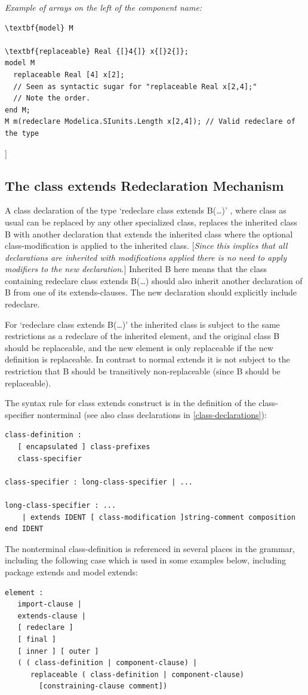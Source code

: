 \documentclass[10pt,a4paper]{report}
\def\doublelabel#1{\label{#1}}
\begin{document}
\emph{Example of arrays on the left of the component name:}
\begin{lstlisting}[language=modelica]
\textbf{model} M

\textbf{replaceable} Real {[}4{]} x{[}2{]};
model M
  replaceable Real [4] x[2];
  // Seen as syntactic sugar for "replaceable Real x[2,4];"
  // Note the order.
end M;
M m(redeclare Modelica.SIunits.Length x[2,4]); // Valid redeclare of the type
\end{lstlisting}

{]}

\subsection{The class extends Redeclaration Mechanism}\doublelabel{the-class-extends-redeclaration-mechanism}

A class declaration of the type `redeclare class extends B(\ldots{})' ,
where class as usual can be replaced by any other specialized class,
replaces the inherited class B with another declaration that extends the
inherited class where the optional class-modification is applied to the
inherited class. {[}\emph{Since this implies that all declarations are
inherited with modifications applied there is no need to apply modifiers
to the new declaration.}{]} Inherited B here means that the class
containing redeclare class extends B(\ldots{}) should also inherit
another declaration of B from one of its extends-clauses. The new
declaration should explicitly include redeclare.

For `redeclare class extends B(\ldots{})' the inherited class is subject
to the same restrictions as a redeclare of the inherited element, and
the original class B should be replaceable, and the new element is only
replaceable if the new definition is replaceable. In contrast to normal
extends it is not subject to the restriction that B should be
transitively non-replaceable (since B should be replaceable).

The syntax rule for class extends construct is in the definition of the
class-specifier nonterminal (see also class declarations in \ref{class-declarations}):

\begin{lstlisting}[language=grammar]
class-definition :
   [ encapsulated ] class-prefixes
   class-specifier
   
class-specifier : long-class-specifier | ...

long-class-specifier : ...
    | extends IDENT [ class-modification ]string-comment composition end IDENT
\end{lstlisting}
The nonterminal class-definition is referenced in several places in the
grammar, including the following case which is used in some examples
below, including package extends and model extends:
\begin{lstlisting}[language=grammar]
element :
   import-clause |
   extends-clause |
   [ redeclare ]
   [ final ]
   [ inner ] [ outer ]
   ( ( class-definition | component-clause) |
      replaceable ( class-definition | component-clause)
        [constraining-clause comment])
\end{lstlisting}
\end{document}
